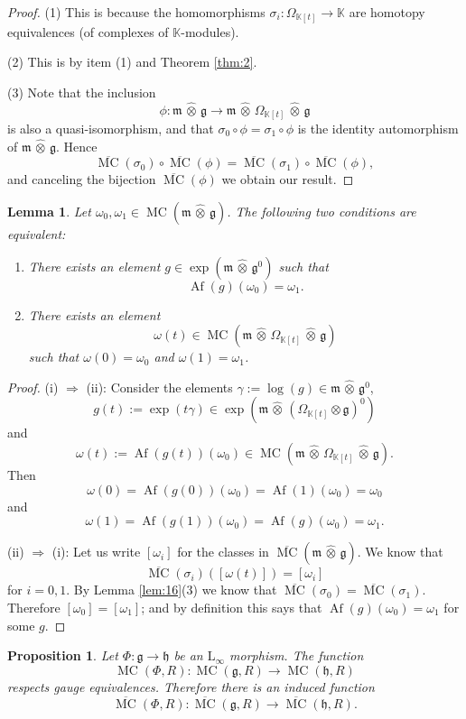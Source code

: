 \documentclass[a4paper,10pt]{amsart}
\newtheorem{prop}[equation]{Proposition}
\newtheorem{lem}[equation]{Lemma}
\theoremstyle{definition}
\numberwithin{equation}{section}
\newcommand{\opn}{\operatorname}
\newcommand{\ol}{\overline}
\newcommand{\rmitem}[1]{\item[\text{\textup{(#1)}}]}
\newcommand{\mfrak}[1]{\mathfrak{#1}}
\newcommand{\mrm}[1]{\mathrm{#1}}
\newcommand{\mbb}[1]{\mathbb{#1}}
\newcommand{\ot}{\otimes}
\newcommand{\what}[1]{\widehat{#1}}
\newcommand{\hatotimes}{\, \what{\otimes} \,}
\newcommand{\hot}{\hatotimes}
\newcommand{\K}{\mbb{K}}
\newcommand{\g}{\mfrak{g}}
\newcommand{\m}{\mfrak{m}}
\newcommand{\h}{\mfrak{h}}
\newcommand{\sg}{\sigma}
\newcommand{\om}{\omega}
\newcommand{\Om}{\Omega}
\newcommand{\ga}{\gamma}
\begin{document}
\begin{proof}
(1) This is because the homomorphisms $\sg_i : \Om_{\K[t]} \to \K$ are
homotopy equivalences (of complexes of $\K$-modules).

\medskip \noindent
(2) This is by item (1) and Theorem \ref{thm:2}.

\medskip \noindent
(3) Note that the inclusion
\[ \phi : \m \hot \g \to \m \hatotimes \Om_{\K[t]} \hatotimes \g \]
is also a quasi-isomorphism, and that 
$\sg_0 \circ \phi = \sg_1 \circ \phi$ is the identity automorphism of 
$\m \hot \g$. Hence 
\[ \ol{\opn{MC}}(\sg_0) \circ \ol{\opn{MC}}(\phi) = 
\ol{\opn{MC}}(\sg_1) \circ \ol{\opn{MC}}(\phi) , \]
and canceling the bijection $\ol{\opn{MC}}(\phi)$ we obtain our result.
\end{proof}

\begin{lem} \label{lem:17}
Let $\om_0, \om_1 \in \opn{MC}(\m \hatotimes \g)$. The following two
conditions are equivalent:
\begin{enumerate}
\rmitem{i} There exists an element 
$g \in \opn{exp}(\m \hatotimes \g^0)$ such that 
\[ \opn{Af}(g)(\om_0) = \om_1 . \]
\rmitem{ii} There exists an element 
\[ \om(t) \in 
\opn{MC}( \m \hatotimes \Om_{\K[t]} \hatotimes \g) \]
such that 
$\om(0) = \om_0$ and $\om(1) = \om_1$. 
\end{enumerate}
\end{lem}

\begin{proof}
(i) $\Rightarrow$ (ii): Consider the elements $\ga := \log(g) \in \m \hot
\g^0$, 
\[ g(t) := \exp(t \ga) \in \exp(\m \hot (\Om_{\K[t]} \ot \g)^0) \]
and 
\[ \om(t) :=  \opn{Af}(g(t))(\om_0) \in 
\opn{MC}(\m \hot \Om_{\K[t]} \hot \g) . \]
Then 
\[ \om(0) = \opn{Af}(g(0))(\om_0) = \opn{Af}(1)(\om_0) = \om_0 \]
and
\[ \om(1) = \opn{Af}(g(1))(\om_0) =
\opn{Af}(g)(\om_0) = \om_1 . \]

\medskip \noindent
(ii) $\Rightarrow$ (i): Let us write $[\om_i]$ for the classes in 
$\ol{\opn{MC}}(\m \hatotimes \g)$.
We know that 
\[ \ol{\opn{MC}}(\sg_i)([\om(t)]) = [\om_i] \]
for $i = 0, 1$. By Lemma \ref{lem:16}(3) we know that 
$\ol{\opn{MC}}(\sg_0) = \ol{\opn{MC}}(\sg_1)$.
Therefore $[\om_0] = [\om_1]$; and by definition this says that 
$\opn{Af}(g)(\om_0) = \om_1$ for some $g$. 
\end{proof}

\begin{prop} \label{prop:5}
Let $\Phi : \g \to \h$ be an $\mrm{L}_{\infty}$ morphism.
The function 
\[ \opn{MC}(\Phi, R) : \opn{MC}(\g, R) \to \opn{MC}(\h, R) \]
respects gauge equivalences. Therefore there is an induced function 
\[ \ol{\opn{MC}}(\Phi, R) : \ol{\opn{MC}}(\g, R) \to 
\ol{\opn{MC}}(\h, R) . \]
\end{prop}
\end{document}
